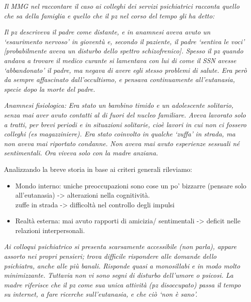 \documentclass[]{article}
\begin{document}
\emph{Il MMG nel raccontare il caso ai colleghi dei servizi psichiatrici
racconta quello che sa della famiglia e quello che il pz nel corso del
tempo gli ha detto:}

\emph{Il pz descriveva il padre come distante, e in anamnesi aveva avuto
un `esaurimento nervoso' in gioventù e, secondo il paziente, il padre
`sentiva le voci' {[}probabilmente aveva un disturbo dello spettro
schizofrenico{]}. Spesso il pz quando andava a trovare il medico curante
si lamentava con lui di come il SSN avesse `abbandonato' il padre, ma
negava di avere egli stesso problemi di salute. Era però da sempre
affascinato dall'occultismo, e pensava continuamente all'eutanasia,
specie dopo la morte del padre.}

\emph{Anamnesi fisiologica: Era stato un bambino timido e un adolescente
solitario, senza mai aver avuto contatti al di fuori del nucleo
familiare. Aveva lavorato solo a tratti, per brevi periodi e in
situazioni solitarie, cioè lavori in cui non ci fossero colleghi (es
magazziniere). Era stato coinvolto in qualche `zuffa' in strada, ma non
aveva mai riportato condanne. Non aveva mai avuto esperienze sessuali né
sentimentali. Ora viveva solo con la madre anziana.}

Analizzando la breve storia in base ai criteri generali rileviamo:

\begin{itemize}
\item
  Mondo interno: uniche preoccupazioni sono cose un po' bizzarre
  (pensare solo all'eutanasia) -\textgreater{} alterazioni nella
  cognitività.\\
  zuffe in strada -\textgreater{} difficoltà nel controllo degli impulsi
\end{itemize}

\begin{itemize}
\item
  Realtà esterna: mai avuto rapporti di amicizia/ sentimentali
  -\textgreater{} deficit nelle relazioni interpersonali.
\end{itemize}

\emph{Ai colloqui psichiatrico si presenta scarsamente accessibile (non
parla), appare assorto nei propri pensieri; trova difficile rispondere
alle domande dello psichiatra, anche alle più banali. Risponde quasi a
monosillabi e in modo molto minimizzante. Tuttavia non vi sono segni di
disturbo dell'umore o psicosi. La madre riferisce che il pz come sua
unica attività (pz disoccupato) passa il tempo su internet, a fare
ricerche sull'eutanasia, e che ciò `non è sano'.}
\end{document}
